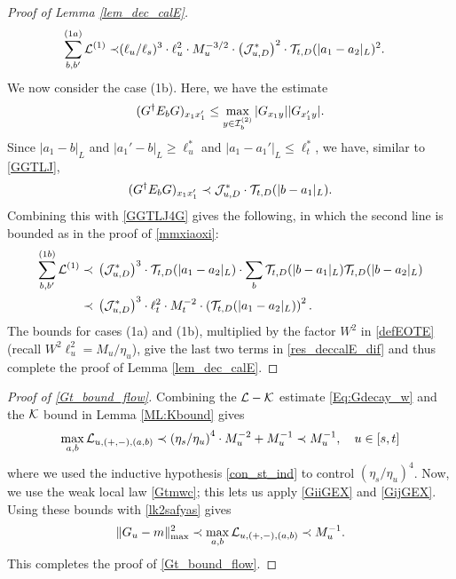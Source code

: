\begin{proof}[Proof of Lemma \ref{lem_dec_calE}]
\begin{align}
  \sum_{b,b'}^{(1a)} {\cal L}^{(1)}
 \prec &(\ell_u/\ell_s)^{3} \cdot \ell_u^{2} \cdot M_{u}^{-3/2}
\cdot\left({\cal J}^*_{u,D}\right)^2  \cdot {\cal T}_{t,D}(|a_1-a_2|_{L}) ^2.
\end{align}
We now consider the case (1b). Here, we have the estimate
$$
(G^\dagger E_bG)_{x_1x_1'}\le \max_{y\in {\cal I}_b^{(2)}}|G_{x_1y}||G_{x'_1y}|.
$$
Since  $ |a_1-b|_{L}$ and $|a_1'-b|_{L} \ge \ell_u^*$ and $|a_{1}-a_{1}'|_{L}\leq\ell_{t}^{*}$,  we have, similar to \eqref{GGTLJ}, 
$$
(G^\dagger E_bG)_{x_1x_1'}
\prec {\cal J}^*_{u,D} \cdot  {\cal T}_{t,D}(|b-a_1|_{L}) .
$$
Combining this with \eqref{GGTLJ4G} gives the following, in which the second line is bounded as in the proof of \eqref{mmxiaoxi}:
\begin{align}
  \sum_{b,b'}^{(1b)} {\cal L}^{(1)}
 \prec\; & \left( {\cal J}^*_{u,D}\right)^3 \cdot  {\cal T}_{t,D}(|a_1-a_2|_{L})\cdot \sum_b {\cal T}_{t,D}(|b-a_1|_{L}) {\cal T}_{t,D}(|b-a_2|_{L})
 \nonumber \\
\prec \; &  \left( {\cal J}^*_{u,D}\right)^3 \cdot \ell_t^{2} \cdot M_{t}^{-2} 
\cdot \left({\cal T}_{t,D}(|a_1-a_2|_{L})\right)^{2}.
 \end{align}
The bounds for cases (1a) and (1b), multiplied by the factor $W^{2}$ in \eqref{defEOTE} (recall $W^{2}\ell_{u}^{2}=M_{u}/\eta_{u}$), give the last two terms in \eqref{res_deccalE_dif} and thus complete the proof of Lemma  \ref{lem_dec_calE}. 
\end{proof}

 

\noindent 
\begin{proof}[Proof of \eqref{Gt_bound_flow}] Combining  the $\cal L-\cal K$ estimate  \eqref{Eq:Gdecay_w} and the $\cal K$ bound in Lemma \ref{ML:Kbound} gives
\begin{equation}
\label{lk2safyas}
 \max_{a, b}{\cal L }_{u, (+,-), (a,b)}\prec \left(\eta_s/\eta_u\right)^4\cdot M_{u}^{-2}+M_{u}^{-1}\prec M_{u}^{-1}  ,\quad u\in [s,t]    
\end{equation}
where we used the inductive hypothesis  \eqref{con_st_ind} to control $(\eta_{s}/\eta_{u})^{4}$. Now, we use the weak local law \eqref{Gtmwc}; this lets us apply \eqref{GiiGEX} and \eqref{GijGEX}. Using these bounds with \eqref{lk2safyas} gives 
$$
\|G_u-m\|^2_{\max}\prec  \max_{a, b}{\cal L }_{u, (+,-), (a,b)}\prec M_{u}^{-1} .
$$
This completes the proof of \eqref{Gt_bound_flow}.   
\end{proof}

